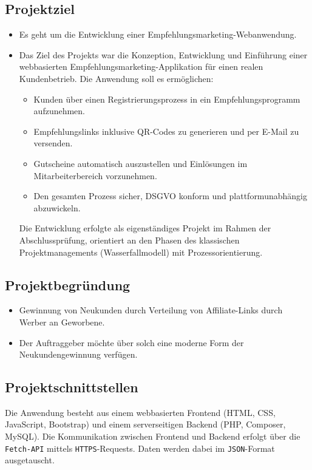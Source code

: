 \subsection{Projektziel} 
\label{sec:Projektziel}
\begin{itemize}
	\item Es geht um die Entwicklung einer Empfehlungsmarketing-Webanwendung.
	\item Das Ziel des Projekts war die Konzeption, Entwicklung und Einführung einer webbasierten Empfehlungsmarketing-Applikation für einen realen Kundenbetrieb.
    Die Anwendung soll es ermöglichen:
    \begin{itemize}
    \item Kunden über einen Registrierungsprozess in ein Empfehlungsprogramm aufzunehmen.
    \item Empfehlungslinks inklusive QR-Codes zu generieren und per E-Mail zu versenden.
    \item Gutscheine automatisch auszustellen und Einlösungen im Mitarbeiterbereich vorzunehmen.
    \item Den gesamten Prozess sicher, \acs{DSGVO} konform und plattformunabhängig abzuwickeln.    
    \end{itemize}
Die Entwicklung erfolgte als eigenständiges Projekt im Rahmen der Abschlussprüfung, orientiert an den Phasen des klassischen Projektmanagements (Wasserfallmodell) mit Prozessorientierung.
\end{itemize}

\subsection{Projektbegründung} 
\label{sec:Projektbegruendung}
\begin{itemize}
	\item Gewinnung von Neukunden durch Verteilung von Affiliate-Links durch Werber an Geworbene.
	\item Der Auftraggeber möchte über solch eine moderne Form der Neukundengewinnung verfügen.
\end{itemize}


\subsection{Projektschnittstellen} 
\label{sec:Projektschnittstellen}
Die Anwendung besteht aus einem webbasierten Frontend (\ac{HTML}, \ac{CSS}, JavaScript, Bootstrap) und einem serverseitigen Backend (\ac{PHP}, \ac{Composer}, \ac{MySQL}).  
Die Kommunikation zwischen Frontend und Backend erfolgt über die \texttt{Fetch-API} mittels \texttt{\ac{HTTPS}}-Requests.  
Daten werden dabei im \texttt{JSON}-Format ausgetauscht.  

